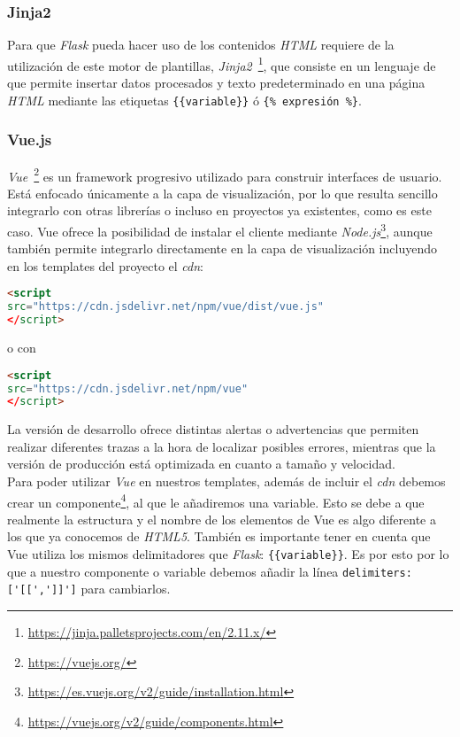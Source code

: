 \subsubsection{Jinja2}\label{sub:jinja}
Para que \textit{Flask} pueda hacer uso de los contenidos \textit{HTML} requiere de la utilización de este motor de plantillas, \textit{Jinja2}~\footnote{\url{https://jinja.palletsprojects.com/en/2.11.x/}}, que consiste en un lenguaje de que permite insertar datos procesados y texto predeterminado en una página \textit{HTML} mediante las etiquetas \verb|{{variable}}| ó \verb|{% expresión %}|.


\subsubsection{Vue.js}\label{sub:vue}
\textit{Vue}~\footnote{\url{https://vuejs.org/}} es un framework progresivo utilizado para construir interfaces de usuario. Está enfocado únicamente a la capa de visualización, por lo que resulta sencillo integrarlo con otras librerías o incluso en proyectos ya existentes, como es este caso.
Vue ofrece la posibilidad de instalar el cliente mediante \textit{Node.js}\footnote{\url{https://es.vuejs.org/v2/guide/installation.html}}, aunque también permite integrarlo directamente en la capa de visualización incluyendo en los templates del proyecto el \textit{cdn}:

\renewcommand{\lstlistingname}{Vue.js cdn}%
\renewcommand{\lstlistlistingname}{List of \lstlistingname s}
\begin{lstlisting}[language=html,caption={Versión de desarrollo.}]
<script
src="https://cdn.jsdelivr.net/npm/vue/dist/vue.js"
</script>
\end{lstlisting}
o con
\begin{lstlisting}[language=html,caption={Versión de producción.}]
<script
src="https://cdn.jsdelivr.net/npm/vue"
</script>
\end{lstlisting}
La versión de desarrollo ofrece distintas alertas o advertencias que permiten realizar diferentes trazas a la hora de localizar posibles errores, mientras que la versión de producción está optimizada en cuanto a tamaño y velocidad.
\\
Para poder utilizar \textit{Vue} en nuestros templates, además de incluir el \textit{cdn} debemos crear un componente\footnote{\url{https://vuejs.org/v2/guide/components.html}}, al que le añadiremos una variable. Esto se debe a que realmente la estructura y el nombre de los elementos de Vue es algo diferente a los que ya conocemos de \textit{HTML5}. También es importante tener en cuenta que Vue utiliza los mismos delimitadores que \textit{Flask}: \verb|{{variable}}|. Es por esto por lo que a nuestro componente o variable debemos añadir la línea \verb|delimiters:['[[',']]']| para cambiarlos.


